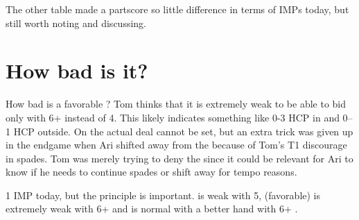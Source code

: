 \documentclass[tom-ari]{subfile}
\begin{document}
The other table made a partscore so little difference in terms of IMPs today, but still worth noting and discussing.

\section{How bad is it?}



How bad is a favorable ?  Tom thinks that it is extremely weak to be able to bid only  with 6+ instead of 4.  This likely indicates something like 0-3 HCP in \sss and 0--1 HCP outside.  On the actual deal  cannot be set, but an extra trick was given up in the endgame when Ari shifted away from the  because of Tom's T1 discourage in spades.  Tom was merely trying to deny the  since it could be relevant for Ari to know if he needs to continue spades or shift away for tempo reasons.

1 IMP today, but the principle is important.   is weak with 5,  (favorable) is extremely weak with 6+ and  is normal with a better hand with 6+ \sss.
	
\end{document}

